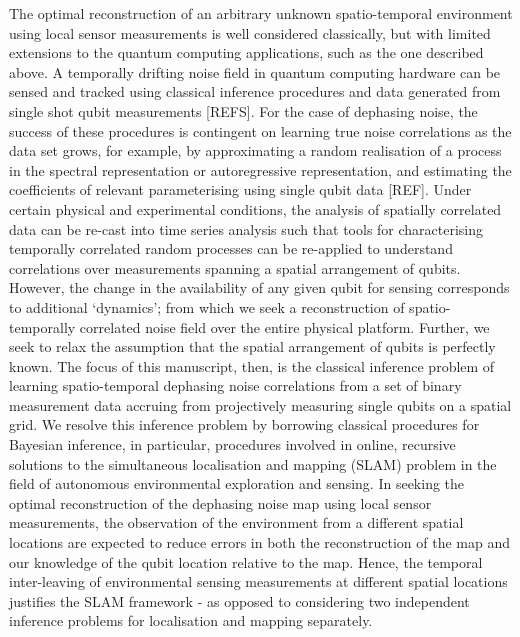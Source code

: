 The optimal reconstruction of an arbitrary unknown spatio-temporal environment using local sensor measurements is well considered classically, but with limited extensions to the quantum computing applications, such as the one described above. A temporally drifting noise field in quantum computing hardware can be sensed and tracked using classical inference procedures and data generated from single shot qubit measurements [REFS]. For the case of dephasing noise, the success of these procedures is contingent on learning true noise correlations as the data set grows, for example, by approximating a random realisation of a process in the spectral representation or autoregressive representation, and estimating the coefficients of relevant parameterising using single qubit data [REF]. Under certain physical and experimental conditions, the analysis of spatially correlated data can be re-cast into time series analysis such that tools for characterising temporally correlated random processes can be re-applied to understand correlations over measurements spanning a spatial arrangement of qubits. However, the  change in the availability of any given qubit for sensing corresponds to additional `dynamics'; from which we seek a reconstruction of spatio-temporally correlated noise field over the entire physical platform. Further, we seek to relax the assumption that the spatial arrangement of qubits is perfectly known. The focus of this manuscript, then, is the classical inference problem of learning spatio-temporal dephasing noise correlations from a set of binary measurement data accruing from projectively measuring single qubits on a spatial grid. We resolve this inference problem by borrowing classical procedures for Bayesian inference, in particular, procedures involved in  online, recursive solutions to the simultaneous localisation and mapping (SLAM) problem in the field of autonomous environmental exploration and sensing. In seeking the optimal reconstruction of the dephasing noise map using local sensor measurements, the observation of the environment from a different spatial locations are expected to reduce errors in both the reconstruction of the map and our knowledge of the qubit location relative to the map. Hence, the temporal inter-leaving of environmental sensing measurements at different spatial locations justifies the SLAM framework - as opposed to considering two independent inference problems for localisation and mapping separately.\\
\\

